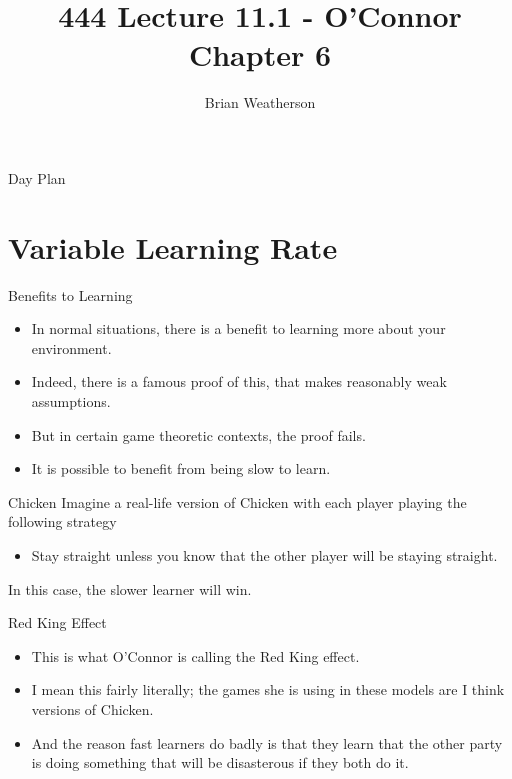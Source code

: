 \documentclass[
  ignorenonframetext,
]{beamer}
\title{444 Lecture 11.1 - O'Connor Chapter 6}
\author{Brian Weatherson}
\date{}
\providecommand{\tightlist}{%
  \setlength{\itemsep}{0pt}\setlength{\parskip}{0pt}}
\begin{document}
\frame{\titlepage}

\begin{frame}{Day Plan}
\protect\hypertarget{day-plan}{}
\tableofcontents
\end{frame}

\hypertarget{variable-learning-rate}{%
\section{Variable Learning Rate}\label{variable-learning-rate}}

\begin{frame}{Benefits to Learning}
\protect\hypertarget{benefits-to-learning}{}
\begin{itemize}
\tightlist
\item
  In normal situations, there is a benefit to learning more about your
  environment.
\item
  Indeed, there is a famous proof of this, that makes reasonably weak
  assumptions.
\item
  But in certain game theoretic contexts, the proof fails.
\item
  It is possible to benefit from being slow to learn.
\end{itemize}
\end{frame}

\begin{frame}{Chicken}
\protect\hypertarget{chicken}{}
Imagine a real-life version of Chicken with each player playing the
following strategy

\begin{itemize}
\tightlist
\item
  Stay straight unless you know that the other player will be staying
  straight. \pause
\end{itemize}

In this case, the slower learner will win.
\end{frame}

\begin{frame}{Red King Effect}
\protect\hypertarget{red-king-effect}{}
\begin{itemize}
\tightlist
\item
  This is what O'Connor is calling the Red King effect.
\item
  I mean this fairly literally; the games she is using in these models
  are I think versions of Chicken.
\item
  And the reason fast learners do badly is that they learn that the
  other party is doing something that will be disasterous if they both
  do it.
\end{itemize}
\end{frame}
\end{document}
